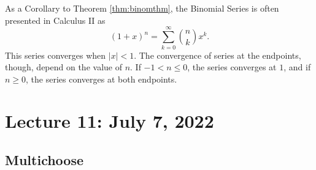         \vphantom
        \\
        \\
        As a Corollary to Theorem \ref{thm:binomthm}, the Binomial Series is often presented in Calculus II as
        \begin{equation*}
            (1+x)^n=\sum_{k=0}^{\infty}\binom{n}{k}x^k.
        \end{equation*}
        This series converges when \(|x|<1\). The convergence of series at the endpoints, though, depend on the value of \(n\). If \(-1<n\leq 0\), the series converges at \(1\), and if \(n\geq 0\), the series converges at both endpoints.
        
    \pagebreak
    
\section{Lecture 11: July 7, 2022}
        
    \subsection{Multichoose}
    

